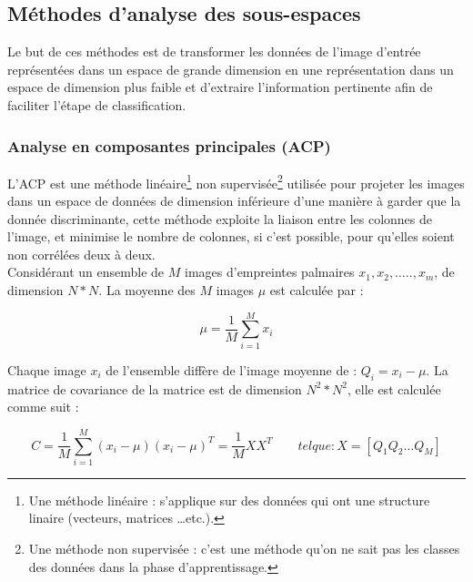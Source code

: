 \subsection{Méthodes d'analyse des sous-espaces }
\label{spacemethodes}
Le but de ces méthodes est de transformer les données de l'image d'entrée représentées dans un espace de grande dimension en une représentation dans un espace de dimension plus faible et d'extraire l'information pertinente afin de faciliter l'étape de classification. 

\subsubsection{Analyse en composantes principales (ACP)}
\label{ACP}
L’ACP est une méthode linéaire\footnote{Une méthode linéaire : s’applique sur des données qui ont une structure linaire (vecteurs, matrices …etc.).} non supervisée\footnote{Une méthode non supervisée : c’est une méthode qu’on ne sait pas les classes des données dans la phase d’apprentissage.} utilisée pour projeter les images dans un espace de données de dimension inférieure d’une manière à garder que la donnée discriminante, cette méthode exploite la liaison entre les colonnes de l’image, et minimise le nombre de colonnes, si c’est possible, pour qu’elles soient non corrélées deux à deux\citep{lu2003palmprint}. 
\\Considérant un ensemble de $ M $ images d'empreintes palmaires $ x_{1}, x_{2},…..,x_{m} $, de dimension $ N * N $.
La moyenne des $ M $ images $\mu $ est calculée par :
\begin{center}
	\begin{equation}\label{eq:chapitre3eq1}
	\mu = \frac{1}{M}\sum_{i=1}^{M}x_{i}
	\end{equation}
\end{center}
Chaque image $ {x_{i}}$ de l'ensemble diffère de l'image moyenne de : $ Q_{i}=x_{i}-\mu$.
La matrice de covariance de la matrice est de dimension $N^{2}*N^{2}$, elle est calculée comme suit :
\begin{center}
	\begin{equation}\label{eq:chapitre3eq2}
	C = \frac{1}{M}\sum_{i=1}^{M}(x_{i}-\mu)(x_{i}-\mu)^{T}=\frac{1}{M}XX^{T} \qquad tel que : \! X= [Q_{1} Q_{2}… Q_{M}]
	\end{equation}
\end{center}

